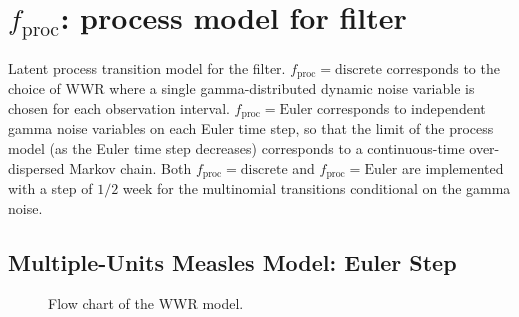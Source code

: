 \documentclass{article}
\newcommand\fproc{f_{\mathrm{proc}}}
\newcommand\fprocDiscrete{\mathrm{discrete}}
\newcommand\fprocEuler{\mathrm{Euler}}
\begin{document}
\setcounter{section}{0}
\setcounter{page}{1}
\renewcommand{\thepage}{S\arabic{page}}
\renewcommand{\thesection}{S\arabic{section}}


\section{$\fproc$: process model for filter}

Latent process transition model for the filter.
$\fproc=\fprocDiscrete$ corresponds to the choice of WWR where a single gamma-distributed dynamic noise variable is chosen for each observation interval. $\fproc=\fprocEuler$ corresponds to independent gamma noise variables on each Euler time step, so that the limit of the process model (as the Euler time step decreases) corresponds to a continuous-time over-dispersed Markov chain. 
Both $\fproc=\fprocDiscrete$ and $\fproc=\fprocEuler$ are implemented with a step of $1/2$ week for the multinomial transitions conditional on the gamma noise. 


\subsection{Multiple-Units Measles Model: Euler Step}

\begin{figure}[htbp]
    \centering
    \caption{Flow chart of the WWR model.}
    \label{fig:enter-label}
\end{figure}
\end{document}
